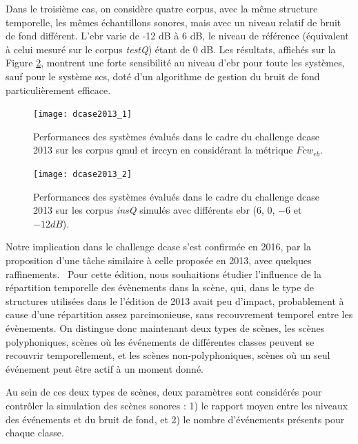 Dans le troisième cas, on considère quatre corpus, avec la même structure temporelle, les mêmes échantillons sonores, mais avec un niveau relatif de bruit de fond différent. L'ebr varie de -12 dB à 6 dB, le niveau de référence (équivalent à celui mesuré sur le corpus \emph{testQ})  étant de 0 dB. Les résultats, affichés sur la Figure \ref{fig:ebr}, montrent une forte sensibilité au niveau d'ebr pour toute les systèmes, sauf pour le système scs, doté d'un algorithme de gestion du bruit de fond particulièrement efficace.~\cite{lafayhal-01111381}

\begin{figure}[t]
  \texttt{[image: dcase2013\_1]}
  \caption{Performances des systèmes évalués dans le cadre du challenge dcase 2013 sur les corpus qmul et irccyn en considérant la métrique $Fcw_{eb}$.}
  \label{fig:irccyn}
  \vspace{-4em}
\end{figure}

\begin{figure}[t]
  \begin{center}
    \texttt{[image: dcase2013\_2]}
    \caption{Performances des systèmes évalués dans le cadre du challenge dcase 2013 sur les corpus \emph{insQ} simulés avec différents ebr ($6$, $0$, $-6$ et $-12dB$).}
    \label{fig:ebr}
  \end{center}
  \vspace{-4em}
\end{figure}

Notre implication dans le challenge dcase s'est confirmée en 2016, par la proposition d'une tâche similaire à celle proposée en 2013, avec quelques raffinements.~\cite{mesa} Pour cette édition, nous souhaitions étudier l'influence de la répartition temporelle des évènements dans la scène, qui, dans le type de structures utilisées dans le l'édition de 2013 avait peu d'impact, probablement à cause d'une répartition assez parcimonieuse, sans recouvrement temporel entre les évènements. On distingue donc maintenant deux types de scènes, les scènes polyphoniques, scènes où les événements de différentes classes peuvent se recouvrir temporellement, et les scènes non-polyphoniques, scènes où un seul événement peut être actif à un moment donné.

Au sein de ces deux types de scènes, deux paramètres sont considérés pour contrôler la simulation des scènes sonores : 1) le rapport moyen entre les niveaux des événements et du bruit de fond, et 2) le nombre d'événements présents pour chaque classe.

